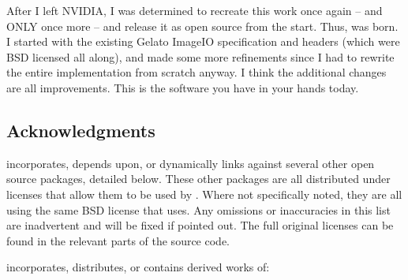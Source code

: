 After I left NVIDIA, I was determined to recreate this work once
again -- and ONLY once more -- and release it as open source from the
start.  Thus, \product was born.  I started with the existing Gelato
ImageIO specification and headers (which were BSD licensed all along),
and made some more refinements since I had to rewrite the entire
implementation from scratch anyway.  I think the additional changes are
all improvements.  This is the software you have in your hands today.


\subsection*{Acknowledgments}

\begin{comment}
The direct precursor to \product was Gelato's ImageIO, which was
co-designed and implemented by Larry Gritz, Dan Wexler, Jonathan Rice, Eric
Enderton, and Philip Nemec.

Big thanks to our bosses at NVIDIA for allowing us to share the API spec
and headers under the BSD license.  And thanks to their inability to
open source their own implementation in a timely manner, I was forced to
create this clearly superior descendant.
\end{comment}

\product incorporates, depends upon, or dynamically links against several
other open source packages, detailed below. These other packages are all
distributed under licenses that allow them to be used by \product. Where not
specifically noted, they are all using the same BSD license that \product
uses. Any omissions or inaccuracies in this list are inadvertent and will be
fixed if pointed out. The full original licenses can be found in the
relevant parts of the source code.

\smallskip
\noindent \product incorporates, distributes, or contains derived works of:

